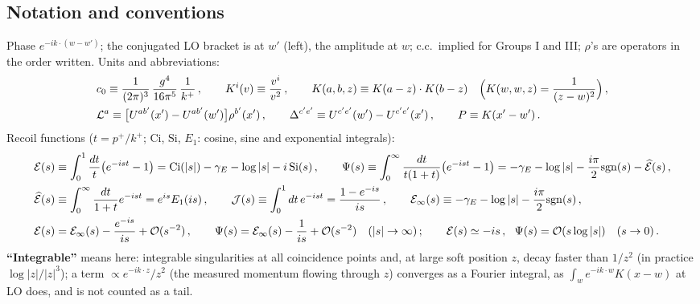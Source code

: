 \subsection{Notation and conventions}
\noindent Phase $e^{-ik\cdot(w-w')}$; the conjugated LO bracket is at $w'$ (left), the amplitude at $w$; c.c.\ implied for Groups I and III; $\rho$'s are operators in the order written. Units and abbreviations:
\begin{align}
&c_{0}\equiv\frac{1}{(2\pi)^{3}}\,\frac{g^{4}}{16\pi^{5}}\,\frac{1}{k^{+}}\,,\qquad K^{i}(v)\equiv\frac{v^{i}}{v^{2}}\,,\qquad K(a,b,z)\equiv K(a-z)\cdot K(b-z)\quad\Big(K(w,w,z)=\frac{1}{(z-w)^{2}}\Big)\,,\notag\\
&\mathcal{L}^{a}\equiv\big[U^{ab'}(x')-U^{ab'}(w')\big]\rho^{b'}(x')\,,\qquad \Delta^{c'e'}\equiv U^{c'e'}(w')-U^{c'e'}(x')\,,\qquad P\equiv K(x'-w')\,.\notag
\end{align}
Recoil functions ($t=p^{+}/k^{+}$; $\mathrm{Ci}$, $\mathrm{Si}$, $E_{1}$: cosine, sine and exponential integrals):
\begin{align}
\mathcal{E}(s)&\equiv\int_{0}^{1}\frac{dt}{t}\big(e^{-ist}-1\big)=\mathrm{Ci}(|s|)-\gamma_{E}-\log|s|-i\,\mathrm{Si}(s)\,,\qquad
\Psi(s)\equiv\int_{0}^{\infty}\frac{dt}{t(1+t)}\big(e^{-ist}-1\big)=-\gamma_{E}-\log|s|-\frac{i\pi}{2}{\rm sgn}(s)-\widehat{\mathcal{E}}(s)\,,\notag\\
\widehat{\mathcal{E}}(s)&\equiv\int_{0}^{\infty}\frac{dt}{1+t}e^{-ist}=e^{is}E_{1}(is)\,,\qquad \mathcal{J}(s)\equiv\int_{0}^{1}dt\,e^{-ist}=\frac{1-e^{-is}}{is}\,,\qquad
\mathcal{E}_{\infty}(s)\equiv-\gamma_{E}-\log|s|-\frac{i\pi}{2}{\rm sgn}(s)\,,\label{sf:fun}\\
\mathcal{E}(s)&=\mathcal{E}_{\infty}(s)-\frac{e^{-is}}{is}+{\cal O}(s^{-2})\,,\qquad \Psi(s)=\mathcal{E}_{\infty}(s)-\frac{1}{is}+{\cal O}(s^{-2})\quad(|s|\to\infty)\,;\qquad \mathcal{E}(s)\simeq-is\,,\ \ \Psi(s)={\cal O}(s\log|s|)\quad(s\to0)\,.\notag
\end{align}
\textbf{``Integrable''} means here: integrable singularities at all coincidence points and, at large soft position $z$, decay faster than $1/z^{2}$ (in practice $\log|z|/|z|^{3}$); a term $\propto e^{-ik\cdot z}/z^{2}$ (the measured momentum flowing through $z$) converges as a Fourier integral, as $\int_{w}e^{-ik\cdot w}K(x-w)$ at LO does, and is not counted as a tail.

